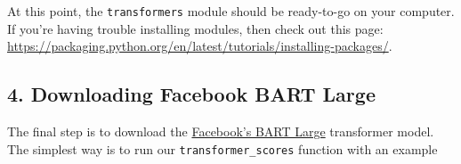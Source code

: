 \documentclass[
]{article}
\newenvironment{Shaded}{\begin{snugshade}}{\end{snugshade}}
\newcommand{\AttributeTok}[1]{\textcolor[rgb]{0.77,0.63,0.00}{#1}}
\newcommand{\CommentTok}[1]{\textcolor[rgb]{0.56,0.35,0.01}{\textit{#1}}}
\newcommand{\ConstantTok}[1]{\textcolor[rgb]{0.00,0.00,0.00}{#1}}
\newcommand{\DecValTok}[1]{\textcolor[rgb]{0.00,0.00,0.81}{#1}}
\newcommand{\FunctionTok}[1]{\textcolor[rgb]{0.00,0.00,0.00}{#1}}
\newcommand{\NormalTok}[1]{#1}
\newcommand{\SpecialCharTok}[1]{\textcolor[rgb]{0.00,0.00,0.00}{#1}}
\newcommand{\StringTok}[1]{\textcolor[rgb]{0.31,0.60,0.02}{#1}}
\begin{document}
At this point, the \texttt{transformers} module should be ready-to-go on
your computer. If you're having trouble installing modules, then check
out this page:
\url{https://packaging.python.org/en/latest/tutorials/installing-packages/}.

\hypertarget{downloading-facebook-bart-large}{%
\subsection{4. Downloading Facebook BART
Large}\label{downloading-facebook-bart-large}}

The final step is to download the
\href{https://huggingface.co/facebook/bart-large-mnli}{Facebook's BART Large}
transformer model. The simplest way is to run our
\texttt{transformer\_scores} function with an example

\begin{Shaded}
\end{Shaded}
\end{document}
